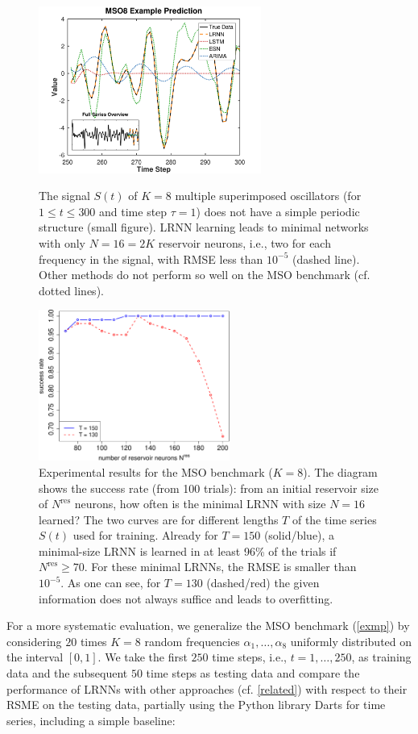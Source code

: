 \documentclass[twoside,11pt]{article}
\theoremstyle{definition}
\begin{document}
\begin{figure}
  \centering
  \includegraphics[width=0.65\textwidth]{fig/mso8_prediction_1}
  \caption{The signal $S(t)$ of $K=8$ multiple superimposed oscillators (for $1
	\le t \le 300$ and time step $\tau=1$) does not have a simple periodic
	structure (small figure). LRNN learning leads to minimal networks with
	only $N=16=2K$ reservoir neurons, i.e., two for each frequency in the
	signal, with RMSE less than $10^{-5}$ (dashed line). Other methods do
	not perform so well on the MSO benchmark (cf. dotted lines).}
  \label{signal}
\medskip
  \includegraphics[width=0.56\textwidth]{fig/mso8}%
  \caption{Experimental results for the MSO benchmark ($K=8$). The diagram shows the
	success rate (from 100 trials): from an initial reservoir size of $N^\mathrm{res}$
	neurons, how often is the minimal LRNN with size
	$N=16$ learned? The two curves are for different lengths $T$ of the time series
	$S(t)$ used for training. Already for $T=150$ (solid/blue), a
	minimal-size LRNN is learned in at least 96\% of the trials if
	$N^\mathrm{res} \ge 70$. For these minimal LRNNs, the RMSE is smaller
	than $10^{-5}$. As one can see, for $T=130$ (dashed/red) the given
	information does not always suffice and leads to overfitting.}
  \label{mso8}
\end{figure}

For a more systematic evaluation, we generalize the MSO benchmark (\cref{exmp})
by considering $20$ times $K=8$ random frequencies $\alpha_1,\dots,\alpha_8$
uniformly distributed on the interval $[0,1]$. We take the first $250$ time
steps, i.e., $t=1,\dots,250$, as training data and the subsequent $50$ time
steps as testing data and compare the performance of LRNNs with other approaches
(cf. \cref{related}) with respect to their RSME on the testing data, partially
using the Python library Darts \citep[see also \url{http://unit8co.github.io/darts/}]{HLPN+22}  for
time series, including a simple baseline:
\end{document}

